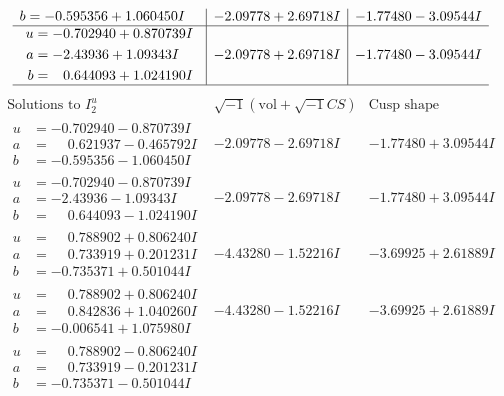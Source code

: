 \documentclass[1p]{elsarticle_modified}
\theoremstyle{definition}
\newcommand{\I}{\sqrt{-1}}
\begin{document}
$$\begin{array}{c|c|c}
\begin{aligned}
b &= -0.595356 + 1.060450 I\end{aligned}
 & -2.09778 + 2.69718 I & -1.77480 - 3.09544 I \\ \hline\begin{aligned}
u &= -0.702940 + 0.870739 I \\
a &= -2.43936 + 1.09343 I \\
b &= \phantom{-}0.644093 + 1.024190 I\end{aligned}
 & -2.09778 + 2.69718 I & -1.77480 - 3.09544 I\\
 \hline 
 \end{array}$$\newpage$$\begin{array}{c|c|c}  
\text{Solutions to }I^u_{2}& \I (\text{vol} + \sqrt{-1}CS) & \text{Cusp shape}\\
 \hline 
\begin{aligned}
u &= -0.702940 - 0.870739 I \\
a &= \phantom{-}0.621937 - 0.465792 I \\
b &= -0.595356 - 1.060450 I\end{aligned}
 & -2.09778 - 2.69718 I & -1.77480 + 3.09544 I \\ \hline\begin{aligned}
u &= -0.702940 - 0.870739 I \\
a &= -2.43936 - 1.09343 I \\
b &= \phantom{-}0.644093 - 1.024190 I\end{aligned}
 & -2.09778 - 2.69718 I & -1.77480 + 3.09544 I \\ \hline\begin{aligned}
u &= \phantom{-}0.788902 + 0.806240 I \\
a &= \phantom{-}0.733919 + 0.201231 I \\
b &= -0.735371 + 0.501044 I\end{aligned}
 & -4.43280 - 1.52216 I & -3.69925 + 2.61889 I \\ \hline\begin{aligned}
u &= \phantom{-}0.788902 + 0.806240 I \\
a &= \phantom{-}0.842836 + 1.040260 I \\
b &= -0.006541 + 1.075980 I\end{aligned}
 & -4.43280 - 1.52216 I & -3.69925 + 2.61889 I \\ \hline\begin{aligned}
u &= \phantom{-}0.788902 - 0.806240 I \\
a &= \phantom{-}0.733919 - 0.201231 I \\
b &= -0.735371 - 0.501044 I\end{aligned}

\end{array}$$
\end{document}
